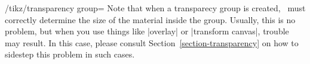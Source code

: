 \begin{key}{/tikz/transparency group=}
  Note that when a transparecy group is created, \tikzname\ must
  correctly determine the size of the material inside the
  group. Usually, this is no problem, but when you use things like
  |overlay| or |transform canvas|, trouble may result. In this case,
  please consult Section~\ref{section-transparency} on how to sidestep
  this problem in such cases.
\end{key}




